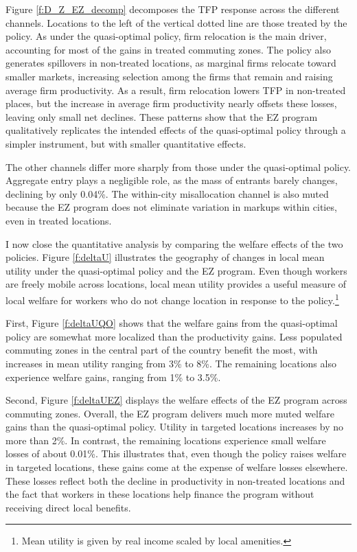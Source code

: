 Figure \ref{f:D_Z_EZ_decomp} decomposes the TFP response across the different channels. Locations to the left of the vertical dotted line are those treated by the policy. As under the quasi-optimal policy, firm relocation is the main driver, accounting for most of the gains in treated commuting zones. The policy also generates spillovers in non-treated locations, as marginal firms relocate toward smaller markets, increasing selection among the firms that remain and raising average firm productivity. As a result, firm relocation lowers TFP in non-treated places, but the increase in average firm productivity nearly offsets these losses, leaving only small net declines. These patterns show that the EZ program qualitatively replicates the intended effects of the quasi-optimal policy through a simpler instrument, but with smaller quantitative effects.

The other channels differ more sharply from those under the quasi-optimal policy. Aggregate entry plays a negligible role, as the mass of entrants barely changes, declining by only 0.04\%. The within-city misallocation channel is also muted because the EZ program does not eliminate variation in markups within cities, even in treated locations.

I now close the quantitative analysis by comparing the welfare effects of the two policies. Figure \ref{f:deltaU} illustrates the geography of changes in local mean utility under the quasi-optimal policy and the EZ program. Even though workers are freely mobile across locations, local mean utility provides a useful measure of local welfare for workers who do not change location in response to the policy.\footnote{Mean utility is given by real income scaled by local amenities.}

First, Figure \ref{f:deltaUQO} shows that the welfare gains from the quasi-optimal policy are somewhat more localized than the productivity gains. Less populated commuting zones in the central part of the country benefit the most, with increases in mean utility ranging from 3\% to 8\%. The remaining locations also experience welfare gains, ranging from 1\% to 3.5\%.

Second, Figure \ref{f:deltaUEZ} displays the welfare effects of the EZ program across commuting zones. Overall, the EZ program delivers much more muted welfare gains than the quasi-optimal policy. Utility in targeted locations increases by no more than 2\%. In contrast, the remaining locations experience small welfare losses of about 0.01\%. This illustrates that, even though the policy raises welfare in targeted locations, these gains come at the expense of welfare losses elsewhere. These losses reflect both the decline in productivity in non-treated locations and the fact that workers in these locations help finance the program without receiving direct local benefits.

